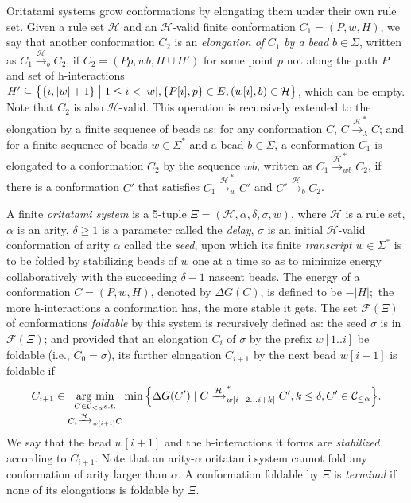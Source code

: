 \documentclass{article}
\theoremstyle{remark}
\newcommand{\argmin}{\mathop{\rm arg~min}\limits}
\begin{document}
Oritatami systems grow conformations by elongating them under their own rule set. 
Given a rule set $\mathcal{H}$ and an $\mathcal{H}$-valid finite conformation $C_1 = (P, w, H)$, 
we say that another conformation $C_2$ is an \textit{elongation of} $C_1$ \textit{by a bead} $b \in \Sigma$, written as $C_1 \xrightarrow{\mathcal{H}}_b C_2$, if $C_2 = (Pp, wb, H \cup H')$ for some point $p$ not along the path $P$ and set of h-interactions $H' \subseteq \left\{ \{i, |w|+1\} \bigm| 1\leq i < |w|, \{P[i], p\} \in E, (w[i], b) \in \mathcal{H}\right\}$, which can be empty.
Note that $C_2$ is also $\mathcal{H}$-valid.
This operation is recursively extended to the elongation by a finite sequence of beads as: 
for any conformation $C$, $C \xrightarrow{\mathcal{H}}^*_\lambda C$; 
and for a finite sequence of beads $w \in \Sigma^*$ and a bead $b \in \Sigma$,
a conformation $C_1$ is elongated to a conformation $C_2$ by the sequence $wb$,
written as $C_1 \xrightarrow{\mathcal{H}}^*_{wb} C_2$, if there is a conformation $C'$ that satisfies
$C_1 \xrightarrow{\mathcal{H}}^*_w C'$ and $C' \xrightarrow{\mathcal{H}}_b C_2$.

A finite \textit{oritatami system} is a 5-tuple $\Xi = (\mathcal{H}, \alpha, \delta, \sigma,w)$, where 
$\mathcal{H}$ is a rule set,
$\alpha$ is an arity, 
$\delta \geq 1$ is a parameter called the \textit{delay}, 
$\sigma$ is an initial $\mathcal{H}$-valid conformation of arity $\alpha$ called the \textit{seed}, upon which its finite \textit{transcript} $w \in \Sigma^*$ is to be folded by stabilizing beads of $w$ one at a time so as to minimize energy collaboratively with the succeeding $\delta -1$ nascent beads. 
The energy of a conformation $C = (P, w, H)$, denoted by $\Delta G(C)$, is defined to be $-|H|;$ the more h-interactions a conformation has, the more stable it gets.
The set $\mathcal{F}(\Xi)$ of conformations \textit{foldable} by this system is recursively defined as: 
the seed $\sigma$ is in $\mathcal{F}(\Xi)$; and provided that an elongation $C_{i}$ of $\sigma$ by the prefix $w[1..i]$ be foldable (i.e., $C_0 = \sigma$), its further elongation $C_{i+1}$ by the next bead $w[i+1]$ is foldable if
\begin{equation}\label{eq:cotranscriptional_folding}
C_{i+1} \in \argmin_{
\substack{
C \in \mathcal{C}_{\le \alpha} s.t. \\
C_i \xrightarrow{\mathcal{H}}_{w[i+1]}C \\
}
}
\min \Big\{ \Delta G(C') \mid 
C \xrightarrow{\mathcal{H}}^*_{w[i+2...i+k]}C', k\le \delta, C' \in \mathcal{C}_{\le \alpha}
\Big\}.
\end{equation}
We say that the bead $w[i+1]$ and the h-interactions it forms are \textit{stabilized} according to $C_{i+1}$.
Note that an arity-$\alpha$ oritatami system cannot fold any conformation of arity larger than $\alpha$.
A conformation foldable by $\Xi$ is \textit{terminal} if none of its elongations is foldable by $\Xi$.
\end{document}
